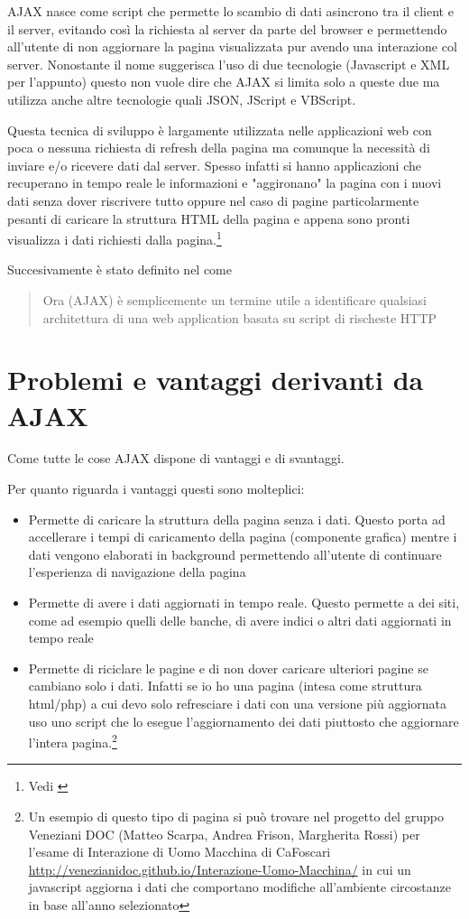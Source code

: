 \documentclass[a4paper,12pt]{report}
\begin{document}
AJAX nasce come script che permette lo scambio di dati asincrono tra il client e il server, evitando così la richiesta al server da parte del browser e permettendo all'utente di non aggiornare la pagina visualizzata pur avendo una interazione col server. Nonostante il nome suggerisca l'uso di due tecnologie (Javascript e XML per l'appunto) questo non vuole dire che AJAX si limita solo a queste due ma utilizza anche altre tecnologie quali JSON, JScript e VBScript.

Questa tecnica di sviluppo è largamente utilizzata nelle applicazioni web con poca o nessuna richiesta di refresh della pagina ma comunque la necessità di inviare e/o ricevere dati dal server. Spesso infatti si hanno applicazioni che recuperano in tempo reale le informazioni e "aggironano" la pagina con i nuovi dati senza dover riscrivere tutto oppure nel caso di pagine particolarmente pesanti di caricare la struttura HTML della pagina e appena sono pronti visualizza i dati richiesti dalla pagina.\footnote{Vedi \cites{flanaganjavascript} }

Succesivamente è stato definito nel \textcites[pag~491]{flanaganjavascript} come 
\begin{quotation}
Ora (AJAX) è semplicemente un termine utile a identificare qualsiasi architettura di una web application basata su script di rischeste HTTP
\end{quotation}

\section{Problemi e vantaggi derivanti da AJAX}
Come tutte le cose AJAX dispone di vantaggi e di svantaggi.

Per quanto riguarda i vantaggi questi sono molteplici:
\begin{itemize}
\item Permette di caricare la struttura della pagina senza i dati. Questo porta ad accellerare i tempi di caricamento della pagina (componente grafica) mentre i dati vengono elaborati in background permettendo all'utente di continuare l'esperienza di navigazione della pagina
\item Permette di avere i dati aggiornati in tempo reale. Questo permette a dei siti, come ad esempio quelli delle banche, di avere indici o altri dati aggiornati in tempo reale
\item Permette di riciclare le pagine e di non dover caricare ulteriori pagine se cambiano solo i dati. Infatti se io ho una pagina (intesa come struttura html/php) a cui devo solo refresciare i dati con una versione più aggiornata uso uno script che lo esegue l'aggiornamento dei dati piuttosto che aggiornare l'intera pagina.\footnote{Un esempio di questo tipo di pagina si può trovare nel progetto del gruppo Veneziani DOC (Matteo Scarpa, Andrea Frison, Margherita Rossi) per l'esame di Interazione di Uomo Macchina di CaFoscari \url{http://venezianidoc.github.io/Interazione-Uomo-Macchina/} in cui un javascript aggiorna i dati che comportano modifiche all'ambiente circostanze in base all'anno selezionato}
\end{itemize}
\end{document}
